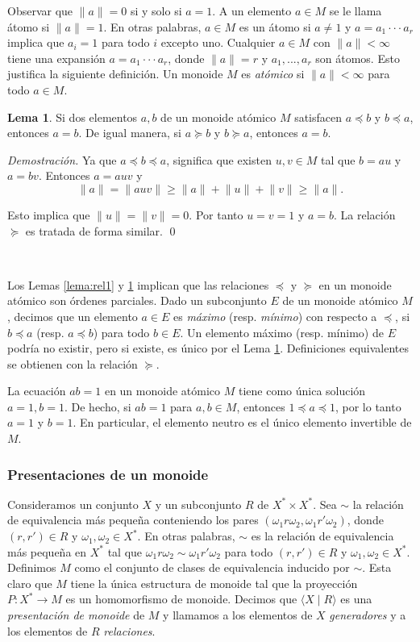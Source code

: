 \documentclass[12pt]{article}
\theoremstyle{definition}
\newtheorem{lema}{Lema}[section]
\providecommand{\norm}[1]{\lVert#1\rVert}
\begin{document}
Observar que $\norm{a}=0$ si y solo si $a=1$. A un elemento $a\in M$ se le llama átomo si $\norm{a}=1$. En otras palabras, $a\in M$ es un átomo si $a\neq 1$ y $a=a_1\cdot\cdot\cdot a_r$ implica que $a_i=1$ para todo $i$ excepto uno. Cualquier $a\in M$ con $\norm{a} < \infty$ tiene una expansión $a=a_1\cdot\cdot\cdot a_r$, donde $\norm{a}=r$ y $a_1,...,a_r$ son átomos. Esto justifica la siguiente definición. Un monoide $M$ es \textit{atómico} si $\norm{a} < \infty$ para todo $a\in M$.

\begin{lema}
Si dos elementos $a,b$ de un monoide atómico $M$ satisfacen $a\preceq b$ y $b\preceq a$, entonces $a=b$. De igual manera, si $a\succeq b$ y $b\succeq a$, entonces $a=b$.
\label{lema:rel2}
\end{lema}

\textit{Demostración.} Ya que $a\preceq b\preceq a$, significa que existen $u,v\in M$ tal que $b=au$ y $a=bv$. Entonces $a=auv$ y
$$\norm{a}=\norm{auv}\geq \norm{a}+\norm{u}+\norm{v}\geq \norm{a}.$$

Esto implica que $\norm{u}=\norm{v}=0$. Por tanto $u=v=1$ y $a=b$. La relación $\succeq$ es tratada de forma similar. \qed

\ 

Los Lemas \ref{lema:rel1} y \ref{lema:rel2} implican que las relaciones $\preceq$ y $\succeq$ en un monoide atómico son órdenes parciales. Dado un subconjunto $E$ de un monoide atómico $M$, decimos que un elemento $a\in E$ es \textit{máximo} (resp. \textit{mínimo}) con respecto a $\preceq$, si $b\preceq a$ (resp. $a\preceq b$) para todo $b\in E$. Un elemento máximo (resp. mínimo) de $E$ podría no existir, pero si existe, es único por el Lema \ref{lema:rel2}. Definiciones equivalentes se obtienen con la relación $\succeq$.

La ecuación $ab=1$ en un monoide atómico $M$ tiene como única solución $a=1,b=1$. De hecho, si $ab=1$ para $a,b\in M$, entonces $1\preceq a \preceq 1$, por lo tanto $a=1$ y $b=1$. En particular, el elemento neutro es el único elemento invertible de $M$.

\subsubsection{Presentaciones de un monoide}
Consideramos un conjunto $X$ y un subconjunto $R$ de $X^*\times X^*$. Sea $\sim$ la relación de equivalencia más pequeña conteniendo los pares $(\omega_1r\omega_2, \omega_1r'\omega_2)$, donde $(r,r')\in R$ y $\omega_1,\omega_2\in X^*$. En otras palabras, $\sim$ es la relación de equivalencia más pequeña en $X^*$ tal que $\omega_1r\omega_2\sim\omega_1r'\omega_2$ para todo $(r,r')\in R$ y $\omega_1,\omega_2\in X^*$. Definimos $M$ como el conjunto de clases de equivalencia inducido por $\sim$. Esta claro que $M$ tiene la única estructura de monoide tal que la proyección $P:X^*\rightarrow M$ es un homomorfismo de monoide. Decimos que $\langle X\mid R\rangle$ es una \textit{presentación de monoide} de $M$ y llamamos a los elementos de $X$ \textit{generadores} y a los elementos de $R$ \textit{relaciones}.
\end{document}
